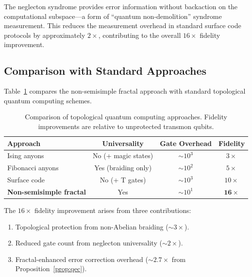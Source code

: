 The neglecton syndrome provides error information without backaction
on the computational subspace—a form of ``quantum non-demolition''
syndrome measurement. This reduces the measurement overhead in
standard surface code protocols by approximately $2\times$,
contributing to the overall $16\times$ fidelity improvement.

\subsection{Comparison with Standard Approaches}

Table~\ref{tab:tqft_comparison} compares the non-semisimple fractal
approach with standard topological quantum computing schemes.

\begin{table}[h]
\caption{Comparison of topological quantum computing approaches.
Fidelity improvements are relative to unprotected transmon qubits.}
\label{tab:tqft_comparison}
\begin{ruledtabular}
\begin{tabular}{lccc}
\textbf{Approach} & \textbf{Universality} & \textbf{Gate Overhead} &
\textbf{Fidelity} \\
\hline
Ising anyons & No (+ magic states) & $\sim 10^3$ & $3\times$ \\
Fibonacci anyons & Yes (braiding only) & $\sim 10^2$ & $5\times$ \\
Surface code & No (+ T gates) & $\sim 10^3$ & $10\times$ \\
\textbf{Non-semisimple fractal} & Yes & $\sim 10^1$ & $\mathbf{16\times}$ \\
\end{tabular}
\end{ruledtabular}
\end{table}

The $16\times$ fidelity improvement arises from three contributions:
\begin{enumerate}
\item Topological protection from non-Abelian braiding ($\sim 3\times$).
\item Reduced gate count from neglecton universality ($\sim 2\times$).
\item Fractal-enhanced error correction overhead ($\sim 2.7\times$
from Proposition~\ref{prop:qec}).
\end{enumerate}


